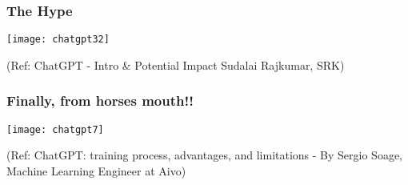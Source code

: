 



\begin{frame}[fragile]\frametitle{The Hype}


\begin{center}
\texttt{[image: chatgpt32]}
\end{center}		

{\tiny (Ref: ChatGPT - Intro \& Potential Impact Sudalai Rajkumar, SRK)}
			

\end{frame}



\begin{frame}[fragile]\frametitle{Finally, from horses mouth!!}


\begin{center}
\texttt{[image: chatgpt7]}
\end{center}		

{\tiny (Ref: ChatGPT: training process, advantages, and limitations - By Sergio Soage, Machine Learning Engineer at Aivo)}
			

\end{frame}




